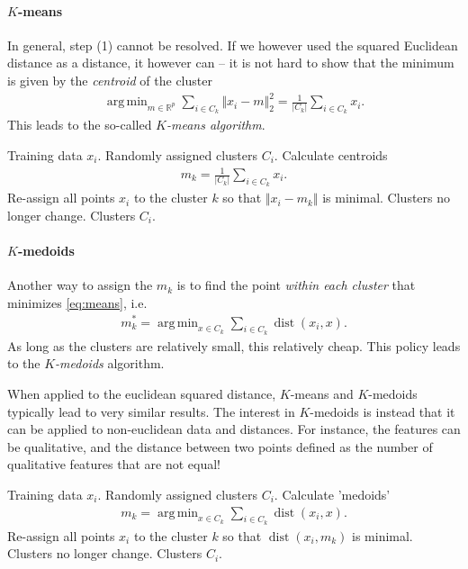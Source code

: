 \documentclass{article}
\DeclareMathOperator*{\argmin}{arg\,min}
\newcommand{\R}{\mathbb{R}}
\newcommand{\abs}[1]{\vert #1 \vert}
\newcommand{\norm}[1]{\Vert #1 \Vert}
\DeclareMathOperator{\dist}{dist}
\begin{document}
\paragraph{$K$-means} 
In general, step (1) cannot be resolved. If we however used the squared Euclidean distance as a distance, it however can -- it is not hard to show that the minimum is given by the \emph{centroid} of the cluster
\begin{align*}
    \argmin_{m\in \R^p} \sum_{i \in C_k} \norm{x_i-m}_2^2 = \frac{1}{\abs{C_k}}\sum_{i \in C_k}x_i.
\end{align*}
This leads to the so-called \emph{$K$-means algorithm}.


\begin{algorithm}[tb]      
	\caption{$K$-means} 
	\label{alg:kmeans}
	\begin{algorithmic} [1]
 		\REQUIRE Training data $x_i$.
 		\STATE Randomly assigned clusters $C_i$.
 		\REPEAT
 			\STATE Calculate centroids
            \begin{align*}
                m_k = \frac{1}{\abs{C_k}}\sum_{i \in C_k}x_i.
            \end{align*}
            \STATE Re-assign all points $x_i$ to the cluster $k$ so that $\norm{x_i-m_k}$ is minimal.
 		\UNTIL Clusters no longer change.
 		\RETURN Clusters $C_i$.
	\end{algorithmic}
\end{algorithm}

\paragraph{$K$-medoids} Another way to assign the $m_k$ is to find the point \emph{within each cluster} that minimizes \eqref{eq:means}, i.e.
\begin{align*}
    m_k^* = \argmin_{x \in C_k} \sum_{i\in C_k} \dist(x_i,x).
\end{align*}
As long as the clusters are relatively small, this relatively cheap. This policy leads to the \emph{$K$-medoids} algorithm. 

When applied to the euclidean squared distance, $K$-means and $K$-medoids typically lead to very similar results. The interest in $K$-medoids is instead that it can be applied to non-euclidean data and distances. For instance, the features can be qualitative, and the distance between two points defined as the number of qualitative features that are not equal!


\begin{algorithm}[tb]      
	\caption{$K$-medoids} 
	\label{alg:kmedoids}
	\begin{algorithmic} [1]
 		\REQUIRE Training data $x_i$.
 		\STATE Randomly assigned clusters $C_i$.
 		\REPEAT
 			\STATE Calculate 'medoids'
            \begin{align*}
                m_k = \argmin_{x \in C_k} \sum_{i\in C_k} \dist(x_i,x).
            \end{align*}
            \STATE Re-assign all points $x_i$ to the cluster $k$ so that $\dist(x_i,m_k)$ is minimal.
 		\UNTIL Clusters no longer change.
 		\RETURN Clusters $C_i$.
	\end{algorithmic}
\end{algorithm}
\end{document}
